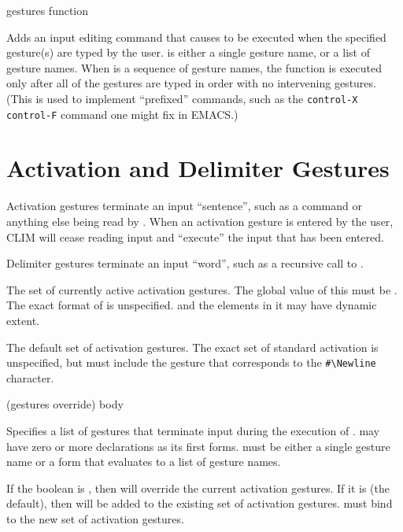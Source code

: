 {gestures function}

Adds an input editing command that causes  to be executed when the
specified gesture(s) are typed by the user.   is either a single
gesture name, or a list of gesture names.  When  is a sequence of
gesture names, the function is executed only after all of the gestures are typed
in order with no intervening gestures.  (This is used to implement ``prefixed''
commands, such as the {\tt control-X control-F} command one might fix in EMACS.)


\section {Activation and Delimiter Gestures}

Activation gestures terminate an input ``sentence'', such as a command or
anything else being read by .  When an activation gesture is entered
by the user, CLIM will cease reading input and ``execute'' the input that has
been entered.

Delimiter gestures terminate an input ``word'', such as a recursive call to
.



The set of currently active activation gestures.  The global value of this must
be .  The exact format of  is unspecified.
 and the elements in it may have dynamic extent.


The default set of activation gestures.  The exact set of standard activation
is unspecified, but must include the gesture that corresponds to the
\verb+#\Newline+ character.

 {(gestures \key override) \body body}

Specifies a list of gestures that terminate input during the execution of
.   may have zero or more declarations as its first forms.
 must be either a single gesture name or a form that evaluates to
a list of gesture names.

If the boolean  is , then  will override
the current activation gestures.  If it is  (the default), then
 will be added to the existing set of activation gestures.
 must bind  to the new
set of activation gestures.


